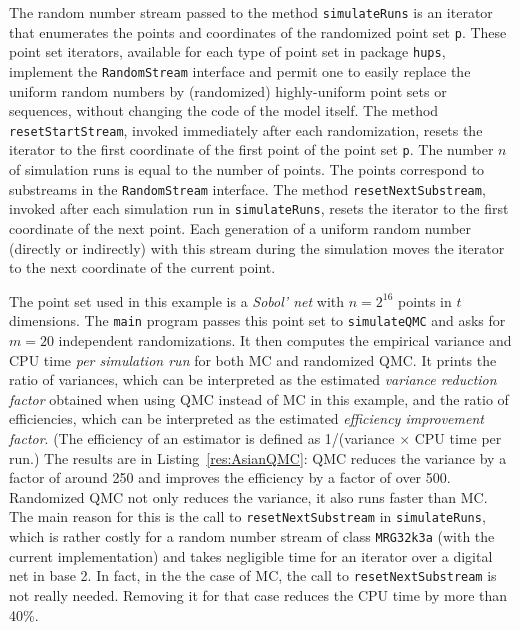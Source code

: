 



The random number stream passed to the method
\texttt{simulateRuns} is an iterator that enumerates the points and
coordinates of the randomized point set \texttt{p}.
These point set iterators, available for each type of point set
in package \texttt{hups}, implement the \texttt{RandomStream} interface
and permit one to easily replace the uniform random numbers by (randomized)
highly-uniform point sets or sequences, without changing the code of
the model itself.
The method \texttt{resetStartStream}, invoked immediately after each
randomization, resets the iterator to the first coordinate of the
first point of the point set \texttt{p}.
The number $n$ of simulation runs is equal to the number of points.
The points correspond to substreams in the \texttt{RandomStream} interface.
The method \texttt{resetNextSubstream}, invoked after each simulation
run in \texttt{simulateRuns}, resets the iterator to the first
coordinate of the next point.
Each generation of a uniform random number (directly or indirectly)
with this stream during the simulation moves the iterator to the next
coordinate of the current point.

The point set used in this example is a \emph{Sobol' net} with
$n = 2^{16}$ points in $t$ dimensions.
The \texttt{main} program passes this point set to \texttt{simulateQMC}
and asks for $m=20$ independent randomizations.
It then computes the empirical variance and CPU time
\emph{per simulation run} for both MC and randomized QMC.
It prints the ratio of variances, which can be
interpreted as the estimated \emph{variance reduction factor} obtained
when using QMC instead of MC in this example, and the ratio of
efficiencies, which can be interpreted
as the estimated \emph{efficiency improvement factor}.
(The efficiency of an estimator is defined as
1/(variance $\times$ CPU time per run.)
The results are in Listing~\ref{res:AsianQMC}:
QMC reduces the variance by a factor of around 250 and improves the
efficiency by a factor of over 500.
Randomized QMC not only reduces the variance, it also runs faster than MC.
The main reason for this is the call to \texttt{resetNextSubstream}
in \texttt{simulateRuns}, which is rather costly for a random
number stream of class \texttt{MRG32k3a} (with the current implementation)
and takes negligible time for an iterator over a digital net in base 2.
In fact, in the the case of MC, the call to \texttt{resetNextSubstream}
is not really needed.  Removing it for that case reduces the CPU
time by more than 40\%.


